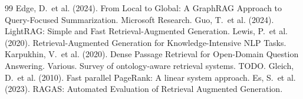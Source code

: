 \documentclass{article}
\begin{document}

% 
\begin{thebibliography}{99}
 Edge, D.\ et al. (2024). From Local to Global: A GraphRAG Approach to Query-Focused Summarization. Microsoft Research.
 Guo, T.\ et al. (2024). LightRAG: Simple and Fast Retrieval-Augmented Generation.
 Lewis, P.\ et al. (2020). Retrieval-Augmented Generation for Knowledge-Intensive NLP Tasks.
 Karpukhin, V.\ et al. (2020). Dense Passage Retrieval for Open-Domain Question Answering.
 Various. Survey of ontology-aware retrieval systems. TODO.
 Gleich, D.\ et al. (2010). Fast parallel PageRank: A linear system approach.
 Es, S.\ et al. (2023). RAGAS: Automated Evaluation of Retrieval Augmented Generation.
\end{thebibliography}
\end{document}
